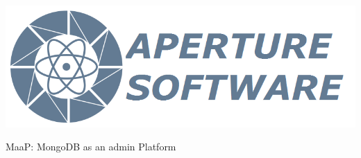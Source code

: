 \documentclass[a4paper]{article}
\newcommand{\Progetto}{MaaP: MongoDB as an admin Platform}
\begin{document}
\thispagestyle{empty}

\begin{center}\centerline{
\includegraphics[scale=0.8]{../Logo&Header/logo.png}}


\vspace{0.8in}

{\Huge {\Progetto}}\\[.5pc]

\underline{\hspace{6in}}\\[8pc]

{\Huge {\TipoDocumento}}\\[1pc]
\end{center}

\end{document}
